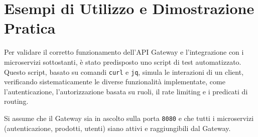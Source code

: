 \section{Esempi di Utilizzo e Dimostrazione Pratica}

Per validare il corretto funzionamento dell'API Gateway e l'integrazione con i microservizi sottostanti, è stato predisposto uno script di test automatizzato. Questo script, basato su comandi \texttt{curl} e \texttt{jq}, simula le interazioni di un client, verificando sistematicamente le diverse funzionalità implementate, come l'autenticazione, l'autorizzazione basata su ruoli, il rate limiting e i predicati di routing.

Si assume che il Gateway sia in ascolto sulla porta \texttt{8080} e che tutti i microservizi (autenticazione, prodotti, utenti) siano attivi e raggiungibili dal Gateway.

